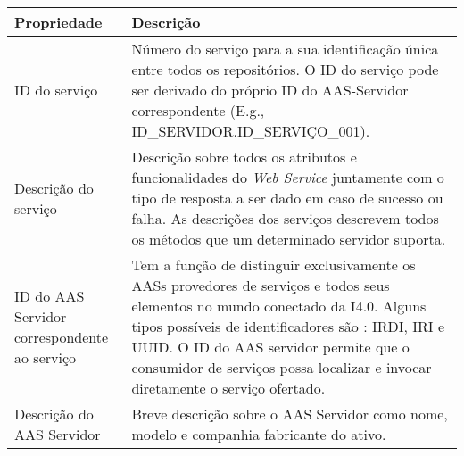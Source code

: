 \begin{table}[htb]
	\centering
	\begin{tabular}{p{4cm}p{11cm}}
		\hline
		\textbf{Propriedade}
		 & \textbf{Descrição}                                                                                                                                                                                                                                                                                                                                                                                                                                                                       \\

		\hline
		ID do serviço
		 & Número do serviço para a sua identificação única entre todos os repositórios. O ID do serviço pode ser derivado do próprio ID do AAS-Servidor correspondente (E.g., ID\_SERVIDOR.ID\_SERVIÇO\_001).                                                                                                                                                                                                                                                                                      \\

		\hline
		Descrição do serviço
		 & Descrição sobre todos os atributos e funcionalidades do \textit{Web Service} juntamente com o tipo de resposta a ser dado em caso de sucesso ou falha. As descrições dos serviços descrevem todos os métodos que um determinado servidor suporta.                                                                                                                                                                                                                                        \\

		\hline
		ID do AAS Servidor correspondente ao serviço
		 & Tem a função de distinguir exclusivamente os AASs provedores de serviços e todos seus elementos \cite{adolphs2016structure} no mundo conectado da I4.0. Alguns tipos possíveis de identificadores são \cite{bader2019aas}: IRDI, IRI e UUID. O ID do AAS servidor permite que o consumidor de serviços possa localizar e invocar diretamente o serviço ofertado.                                                                                                                         \\

		\hline
		Descrição do AAS Servidor
		 & Breve descrição sobre o AAS Servidor como nome, modelo e companhia fabricante do ativo.                                                                                                                                                                                                                                                                                                                                                                                                  \\


\end{tabular}
\end{table}
